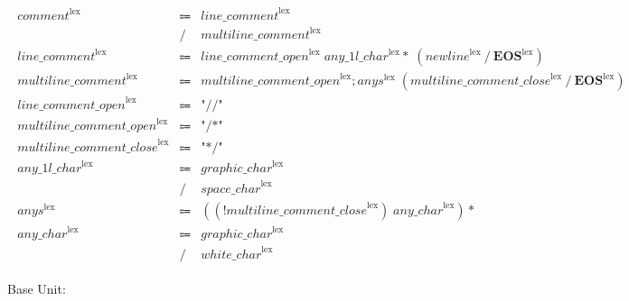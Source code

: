 \begin{align*}
    \begin{array}{rcll}
        \mathit{comment}^\mathrm{lex}
        &\Coloneq &\mathit{line\_comment}^\mathrm{lex} \\
        &\mathrel{/} &\mathit{multiline\_comment}^\mathrm{lex} \\
        \mathit{line\_comment}^\mathrm{lex}
        &\Coloneq &\mathit{line\_comment\_open}^\mathrm{lex}\; \mathit{any\_1l\_char}^\mathrm{lex}{*}\; (\mathit{newline}^\mathrm{lex} \mathrel{/} \mathbf{EOS}^\mathrm{lex}) \\
        \mathit{multiline\_comment}^\mathrm{lex}
        &\Coloneq &\mathit{multiline\_comment\_open}^\mathrm{lex}; \mathit{anys}^\mathrm{lex}\; (\mathit{multiline\_comment\_close}^\mathrm{lex} \mathrel{/} \mathbf{EOS}^\mathrm{lex}) \\
        \mathit{line\_comment\_open}^\mathrm{lex}
        &\Coloneq &\texttt{"//"} \\
        \mathit{multiline\_comment\_open}^\mathrm{lex}
        &\Coloneq &\texttt{"/*"} \\
        \mathit{multiline\_comment\_close}^\mathrm{lex}
        &\Coloneq &\texttt{"*/"} \\
        \mathit{any\_1l\_char}^\mathrm{lex}
        &\Coloneq &\mathit{graphic\_char}^\mathrm{lex} \\
        &\mathrel{/} &\mathit{space\_char}^\mathrm{lex} \\
        \mathit{anys}^\mathrm{lex}
        &\Coloneq &((\mathop{!} \mathit{multiline\_comment\_close}^\mathrm{lex})\; \mathit{any\_char}^\mathrm{lex}){*} \\
        \mathit{any\_char}^\mathrm{lex}
        &\Coloneq &\mathit{graphic\_char}^\mathrm{lex} \\
        &\mathrel{/} &\mathit{white\_char}^\mathrm{lex}
    \end{array}
\end{align*}

Base Unit:

